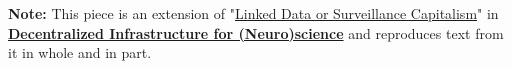 \documentclass{article}
\begin{document}
\restoregeometry
\clearpage

\textbf{Note:} This piece is an extension of "\href{https://jon-e.net/infrastructure/#linked-data-or-surveillance-capitalism}{Linked Data or Surveillance Capitalism}" in \textbf{\href{https://jon-e.net/infrastructure}{Decentralized Infrastructure for (Neuro)science}} \cite{saundersDecentralizedInfrastructureNeuro2022} and reproduces text from it in whole and in part.
\end{document}
